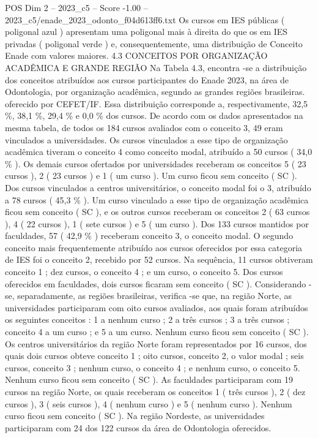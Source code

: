 \begin{textsample}{POS Dim 2 – 2023\_c5 – Score -1.00 – 2023\_c5/enade\_2023\_odonto\_f04d613ff6.txt}
Os cursos em IES públicas ( poligonal azul ) apresentam uma poligonal mais à direita do que os em IES privadas ( poligonal verde ) e, consequentemente, uma distribuição de Conceito Enade com valores maiores. 4.3 CONCEITOS POR ORGANIZAÇÃO ACADÊMICA E GRANDE REGIÃO Na Tabela 4.3, encontra -se a distribuição dos conceitos atribuídos aos cursos participantes do Enade 2023, na área de Odontologia, por organização acadêmica, segundo as grandes regiões brasileiras. oferecido por CEFET/IF.
Essa distribuição corresponde a, respectivamente, 32,5 \%, 38,1 \%, 29,4 \% e 0,0 \% dos cursos.
De acordo com os dados apresentados na mesma tabela, de todos os 184 cursos avaliados com o conceito 3, 49 eram vinculados a universidades.
Os cursos vinculados a esse tipo de organização acadêmica tiveram o conceito 4 como conceito modal, atribuído a 50 cursos ( 34,0 \% ).
Os demais cursos ofertados por universidades receberam os conceitos 5 ( 23 cursos ), 2 ( 23 cursos ) e 1 ( um curso ).
Um curso ficou sem conceito ( SC ).
Dos cursos vinculados a centros universitários, o conceito modal foi o 3, atribuído a 78 cursos ( 45,3 \% ).
Um curso vinculado a esse tipo de organização acadêmica ficou sem conceito ( SC ), e os outros cursos receberam os conceitos 2 ( 63 cursos ), 4 ( 22 cursos ), 1 ( sete cursos ) e 5 ( um curso ).
Dos 133 cursos mantidos por faculdades, 57 ( 42,9 \% ) receberam conceito 3, o conceito modal.
O segundo conceito mais frequentemente atribuído aos cursos oferecidos por essa categoria de IES foi o conceito 2, recebido por 52 cursos.
Na sequência, 11 cursos obtiveram conceito 1 ; dez cursos, o conceito 4 ; e um curso, o conceito 5.
Dos cursos oferecidos em faculdades, dois cursos ficaram sem conceito ( SC ).
Considerando -se, separadamente, as regiões brasileiras, verifica -se que, na região Norte, as universidades participaram com oito cursos avaliados, aos quais foram atribuídos os seguintes conceitos : 1 a nenhum curso ; 2 a três cursos ; 3 a três cursos ; conceito 4 a um curso ; e 5 a um curso.
Nenhum curso ficou sem conceito ( SC ).
Os centros universitários da região Norte foram representados por 16 cursos, dos quais dois cursos obteve conceito 1 ; oito cursos, conceito 2, o valor modal ; seis cursos, conceito 3 ; nenhum curso, o conceito 4 ; e nenhum curso, o conceito 5.
Nenhum curso ficou sem conceito ( SC ).
As faculdades participaram com 19 cursos na região Norte, os quais receberam os conceitos 1 ( três cursos ), 2 ( dez cursos ), 3 ( seis cursos ), 4 ( nenhum curso ) e 5 ( nenhum curso ).
Nenhum curso ficou sem conceito ( SC ).
Na região Nordeste, as universidades participaram com 24 dos 122 cursos da área de Odontologia oferecidos.

\end{textsample}
